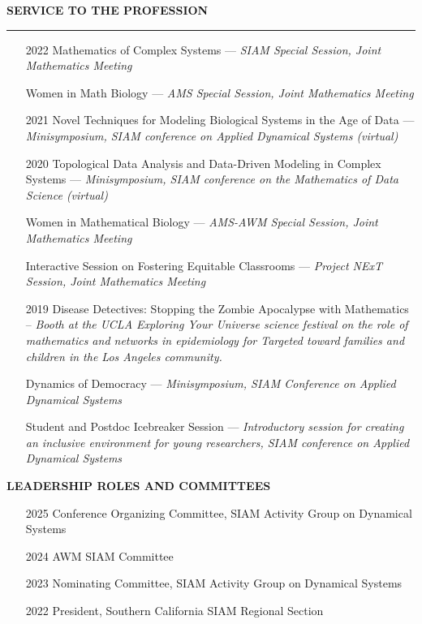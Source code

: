 \documentclass{resume} %
\renewenvironment{rSection}[1]{
\sectionskip
\textcolor{WinePurple}{\MakeUppercase{#1}}
\sectionlineskip
\hrule
\begin{list}{}{
\setlength{\leftmargin}{1.5em}
}
\item[]
}{
\end{list}
}
\begin{document}
\begin{rSection}{\bf Service to the Profession}
\begin{itemize}
    \item[2022] {Mathematics of Complex Systems} ---
    {\em SIAM Special Session, Joint Mathematics Meeting }

    \item[] {Women in Math Biology} --- 
    {\em AMS Special Session, Joint Mathematics Meeting }

    \item[2021] {Novel Techniques for Modeling Biological Systems in the Age of Data} ---
    {\em Minisymposium, SIAM conference on Applied Dynamical Systems (virtual)}

    \item[2020] {Topological Data Analysis and Data-Driven Modeling in Complex Systems} ---
    {\em Minisymposium, SIAM conference on the Mathematics of Data Science (virtual)}

    \item[] {Women in Mathematical Biology} ---
    {\em AMS-AWM Special Session, Joint Mathematics Meeting }  

    \item[] {Interactive Session on Fostering Equitable Classrooms} ---
    {\em Project NExT Session, Joint Mathematics Meeting }

    \item[2019] {Disease Detectives: Stopping the Zombie Apocalypse with Mathematics} --
   {\em Booth at the UCLA Exploring Your Universe science festival on the role of mathematics and networks in epidemiology for Targeted toward families and children in the Los Angeles community.}

    \item[] {Dynamics of Democracy} ---
    {\em Minisymposium, SIAM Conference on Applied Dynamical Systems} 

    \item[] {Student and Postdoc Icebreaker Session} --- 
    {\em Introductory session for creating an inclusive environment for young researchers, SIAM conference on Applied Dynamical Systems}

\end{itemize}

\uppercase{{\bf Leadership Roles and Committees}} 

\begin{itemize}
    \item[2025] Conference Organizing Committee, SIAM Activity Group on Dynamical Systems 
    \item[2024] AWM SIAM Committee 
    \item[2023] Nominating Committee, SIAM Activity Group on Dynamical Systems
    \item[2022] President, Southern California SIAM Regional Section
\end{itemize}



\end{rSection}
\end{document}
